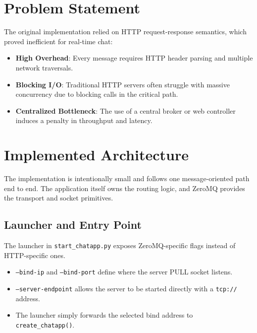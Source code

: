 \documentclass[a4paper,12pt]{article}
\begin{document}
\newpage
\tableofcontents
\newpage

\titleformat{\section}{\Large\bfseries\color{hcmutblue}}{\thesection}{1em}{}

\begin{abstract}
This report details the architectural transition of a chat backend from a synchronous HTTP-based model to a high-performance, brokerless asynchronous system using ZeroMQ. By implementing a PUSH/PULL messaging pattern, we achieved significant reductions in latency and protocol overhead. The design emphasizes the "Smart Endpoint, Dumb Network" philosophy, leveraging lock-free algorithms and the Actor model to ensure linear scalability on multi-core environments while supporting both TCP and intra-process communication.
\end{abstract}

\section{Problem Statement}
The original implementation relied on HTTP request-response semantics, which proved inefficient for real-time chat:
\begin{itemize}[leftmargin=1.4em]
  \item \textbf{High Overhead}: Every message requires HTTP header parsing and multiple network traversals.
  \item \textbf{Blocking I/O}: Traditional HTTP servers often struggle with massive concurrency due to blocking calls in the critical path.
  \item \textbf{Centralized Bottleneck}: The use of a central broker or web controller induces a penalty in throughput and latency.
\end{itemize}

\section{Implemented Architecture}
The implementation is intentionally small and follows one message-oriented path end to end. The application itself owns the routing logic, and ZeroMQ provides the transport and socket primitives.

\subsection{Launcher and Entry Point}
The launcher in \texttt{start\_chatapp.py} exposes ZeroMQ-specific flags instead of HTTP-specific ones.
\begin{itemize}[leftmargin=1.4em]
  \item \texttt{--bind-ip} and \texttt{--bind-port} define where the server PULL socket listens.
  \item \texttt{--server-endpoint} allows the server to be started directly with a \texttt{tcp://} address.
  \item The launcher simply forwards the selected bind address to \texttt{create\_chatapp()}.
\end{itemize}
\end{document}
